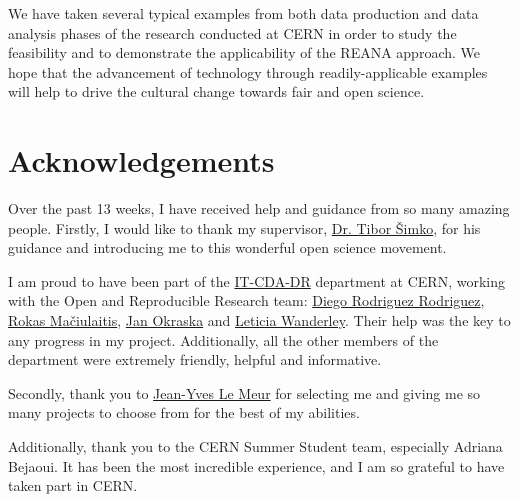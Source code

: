 \noindent
We have taken several typical examples from both data production and data analysis phases of the research conducted at CERN in order to study the feasibility and to demonstrate the applicability of the REANA approach. We hope that the advancement of technology through readily-applicable examples will help to drive the cultural change towards fair and open science.

\section*{Acknowledgements}
Over the past 13 weeks, I have received help and guidance from so many amazing people. Firstly, I would like to thank my supervisor, \href{https://orcid.org/0000-0001-7202-5803}{Dr. Tibor Šimko}, for his guidance and introducing me to this wonderful open science movement.

\noindent
I am proud to have been part of the \href{http://information-technology.web.cern.ch/about/organisation/digital-repositories}{IT-CDA-DR} department at CERN, working with the Open and Reproducible Research team: \href{https://orcid.org/0000-0003-0649-2002}{Diego Rodriguez Rodriguez}, \href{https://orcid.org/0000-0003-1064-6967}{Rokas Mačiulaitis}, \href{https://orcid.org/0000-0002-1416-3244}{Jan Okraska} and \href{https://orcid.org/0000-0003-4649-6630}{Leticia Wanderley}. Their help was the key to any progress in my project. Additionally, all the other members of the department were extremely friendly, helpful and informative.

\noindent
Secondly, thank you to \href{https://orcid.org/0000-0002-9803-6639}{Jean-Yves Le Meur} for selecting me and giving me so many projects to choose from for the best of my abilities.

\noindent
Additionally, thank you to the CERN Summer Student team, especially Adriana Bejaoui. It
has been the most incredible experience, and I am so grateful to have taken part in CERN.
